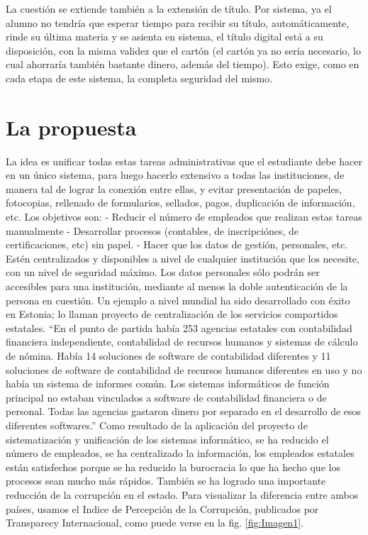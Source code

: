 \documentclass[a4paper]{article}
\begin{document}
La cuestión se extiende también a la extensión de título. Por sistema, ya el alumno no tendría que esperar tiempo para recibir su título, automáticamente, rinde su última materia y se asienta en sistema, el título digital está a su disposición, con la misma validez que el cartón (el cartón ya no sería necesario, lo cual ahorraría también bastante dinero, además del tiempo). Esto exige, como en cada etapa de este sistema, la completa seguridad del mismo. 


\section{La propuesta}

La idea es unificar todas estas tareas administrativas que el estudiante debe hacer en un único sistema, para luego hacerlo extensivo a todas las instituciones, de manera tal de lograr la conexión entre ellas, y evitar presentación de papeles, fotocopias, rellenado de formularios, sellados, pagos, duplicación de información, etc. Los objetivos son:
-	Reducir el número de empleados que realizan estas tareas manualmente
-	Desarrollar procesos (contables, de inscripciónes, de certificaciones, etc) sin papel.
-	Hacer que los datos de gestión, personales, etc. Estén centralizados y disponibles a nivel de cualquier institución que los necesite, con un nivel de seguridad máximo. Los datos personales sólo podrán ser accesibles para una institución, mediante al menos la doble autenticación de la persona en cuestión. 
Un ejemplo a nivel mundial ha sido desarrollado con éxito en Estonia; lo llaman proyecto de centralización de los servicios compartidos estatales. “En el punto de partida había 253 agencias estatales con contabilidad financiera independiente, contabilidad de recursos humanos y sistemas de cálculo de nómina. Había 14 soluciones de software de contabilidad diferentes y 11 soluciones de software de contabilidad de recursos humanos diferentes en uso y no había un sistema de informes común. Los sistemas informáticos de función principal no estaban vinculados a software de contabilidad financiera o de personal. Todas las agencias gastaron dinero por separado en el desarrollo de esos diferentes softwares.”
Como resultado de la aplicación del proyecto de sistematización y unificación de los sistemas informático, se ha reducido el número de empleados, se ha centralizado la información, los empleados estatales están satisfechos porque se ha reducido la burocracia lo que ha hecho que los procesos sean mucho más rápidos. También se ha logrado una importante reducción de la corrupción en el estado. Para visualizar la diferencia entre ambos países, usamos el Indice de Percepción de la Corrupción, publicados por Transparecy Internacional, como puede verse en la fig. \ref{fig:Imagen1}.
\end{document}
